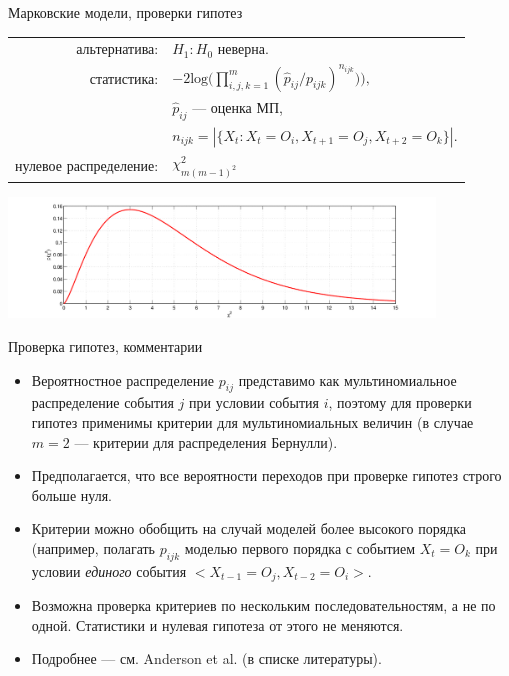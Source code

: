 \begin{frame}{Марковские модели, проверки гипотез}
{\begin{center}
\begin{tabular}{rl}
            альтернатива:                   & $H_1\colon H_0$ неверна.  \\
            статистика:                     & $-2\text{log}\bigl(\prod_{i,j,k=1}^m(\hat{p}_{ij} / {p}_{ijk})^{n_{ijk}})\bigr),$ \\
            ~                               & $\hat{p}_{ij}$ --- оценка МП,\\
            ~                               & $n_{ijk}= |\{X_t: X_t = O_i, X_{t+1} = O_j, X_{t+2} = O_k\}|.$\\
            нулевое распределение:          & $\chi^2_{m(m-1)^2}$\\
		\end{tabular}
		\includegraphics[width=0.85\textwidth]{chi2.png}   
    \end{center}
}
\end{frame}

\begin{frame}{Проверка гипотез, комментарии}
\begin{itemize}
\item Вероятностное распределение $p_{ij}$ представимо как мультиномиальное распределение события $j$ при условии события $i$, поэтому для проверки гипотез применимы критерии для мультиномиальных величин (в случае $m=2$ --- критерии для распределения Бернулли).
\item Предполагается, что все вероятности переходов при проверке гипотез строго больше нуля.
\item Критерии можно обобщить на случай моделей более высокого порядка (например, полагать $p_{ijk}$ моделью первого порядка с событием $X_t = O_k$ при условии \textit{единого} события $<X_{t-1} = O_{j}, X_{t-2} = O_i>$.
\item Возможна проверка критериев по нескольким последовательностям, а не по одной. Статистики и нулевая гипотеза от этого не меняются.
\item Подробнее --- см. Anderson et al. (в списке литературы).
\end{itemize} 
\end{frame}

